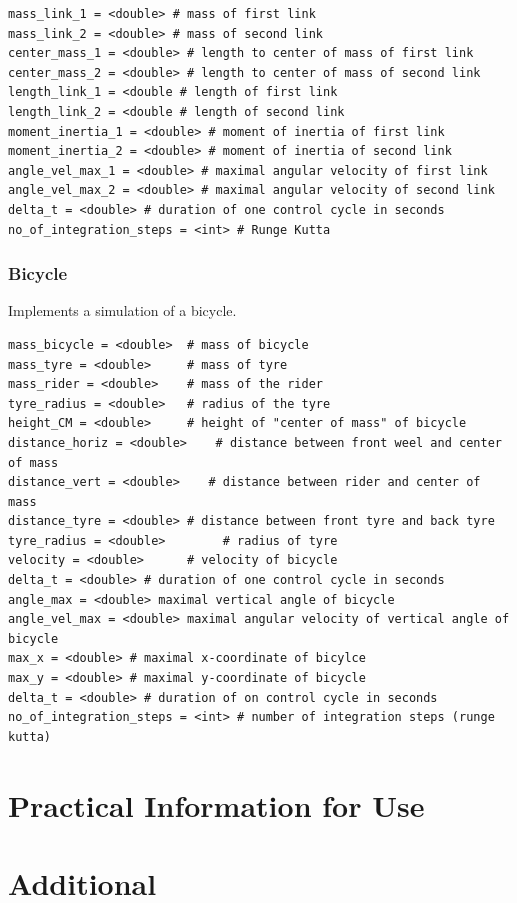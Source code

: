 \documentclass[a4paper,12pt,german]{article}
\begin{document}
\begin{verbatim}
mass_link_1 = <double> # mass of first link
mass_link_2 = <double> # mass of second link
center_mass_1 = <double> # length to center of mass of first link
center_mass_2 = <double> # length to center of mass of second link
length_link_1 = <double # length of first link
length_link_2 = <double # length of second link
moment_inertia_1 = <double> # moment of inertia of first link
moment_inertia_2 = <double> # moment of inertia of second link
angle_vel_max_1 = <double> # maximal angular velocity of first link
angle_vel_max_2 = <double> # maximal angular velocity of second link
delta_t = <double> # duration of one control cycle in seconds
no_of_integration_steps = <int> # Runge Kutta 
\end{verbatim}

\subsubsection{Bicycle}
Implements a simulation of a bicycle. 
\begin{verbatim}
mass_bicycle = <double>  # mass of bicycle
mass_tyre = <double>     # mass of tyre
mass_rider = <double>    # mass of the rider
tyre_radius = <double>   # radius of the tyre
height_CM = <double>     # height of "center of mass" of bicycle
distance_horiz = <double>    # distance between front weel and center of mass
distance_vert = <double>    # distance between rider and center of mass
distance_tyre = <double> # distance between front tyre and back tyre
tyre_radius = <double>        # radius of tyre
velocity = <double>      # velocity of bicycle
delta_t = <double> # duration of one control cycle in seconds
angle_max = <double> maximal vertical angle of bicycle
angle_vel_max = <double> maximal angular velocity of vertical angle of bicycle
max_x = <double> # maximal x-coordinate of bicylce
max_y = <double> # maximal y-coordinate of bicycle
delta_t = <double> # duration of on control cycle in seconds
no_of_integration_steps = <int> # number of integration steps (runge kutta)
\end{verbatim}


\section{Practical Information for Use}


\section{Additional}
\end{document}
